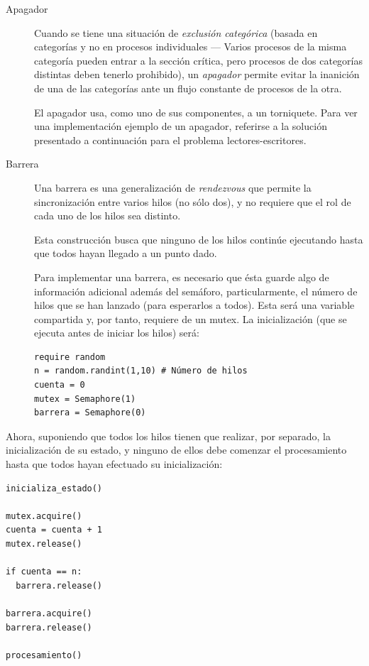 \documentclass[11pt,fleqn]{book} %
\begin{document}
\begin{description}
\item[Apagador] Cuando se tiene una situación de \emph{exclusión categórica}
              (basada en categorías y no en procesos individuales —
              Varios procesos de la misma categoría pueden entrar a la
              sección crítica, pero procesos de dos categorías
              distintas deben tenerlo prohibido), un \emph{apagador}
              permite evitar la inanición de una de las categorías
              ante un flujo constante de procesos de la otra.

	      El apagador usa, como uno de sus componentes, a un
	      torniquete. Para ver una implementación ejemplo de un
	      apagador, referirse a la solución presentado a
	      continuación para el problema lectores-escritores.
\item[Barrera] Una barrera es una generalización de \emph{rendezvous} que
             permite la sincronización entre varios hilos (no sólo
             dos), y no requiere que el rol de cada uno de los hilos
             sea distinto.

	     Esta construcción busca que ninguno de los hilos
             continúe ejecutando hasta que todos hayan llegado a un
             punto dado.

	     Para implementar una barrera, es necesario que ésta
             guarde algo de información adicional además del semáforo,
             particularmente, el número de hilos que se han lanzado
             (para esperarlos a todos). Esta será una variable
             compartida y, por tanto, requiere de un mutex. La
             inicialización (que se ejecuta antes de iniciar los
             hilos) será:


\begin{verbatim}
require random
n = random.randint(1,10) # Número de hilos
cuenta = 0
mutex = Semaphore(1)
barrera = Semaphore(0)
\end{verbatim}
\end{description}

	     Ahora, suponiendo que todos los hilos tienen que
             realizar, por separado, la inicialización de su estado,
             y ninguno de ellos debe comenzar el procesamiento hasta
             que todos hayan efectuado su inicialización:


\begin{verbatim}
inicializa_estado()

mutex.acquire()
cuenta = cuenta + 1
mutex.release()

if cuenta == n:
  barrera.release()

barrera.acquire()
barrera.release()

procesamiento()
\end{verbatim}
\end{document}
